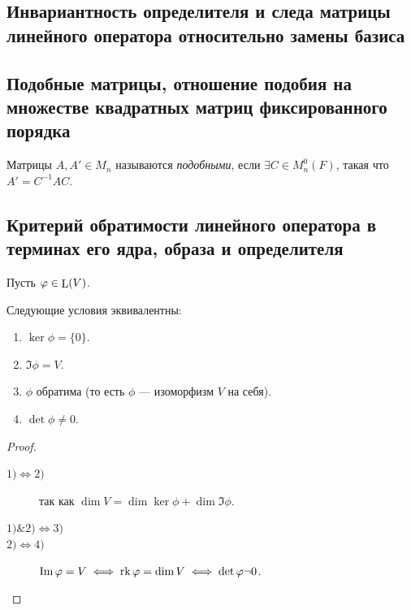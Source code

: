 \subsection{Инвариантность определителя и следа матрицы линейного оператора относительно замены базиса}

\subsection{Подобные матрицы, отношение подобия на множестве квадратных матриц фиксированного порядка}

\begin{definition}
    Матрицы $A, A' \in M_n$ называются \textit{подобными}, если $\exists C \in M_n^{0}(F)$, такая что $A' = C^{-1} A C$.
\end{definition}

\subsection{Критерий обратимости линейного оператора в терминах его ядра, образа и определителя}

Пусть $\varphi \in \operatorname{\mathop{\mathrm{L}}}(V)$.

\begin{proposal}
    Следующие условия эквивалентны:
    \begin{enumerate}[nosep]
    \item $\ker \phi = \{0\}$.
    \item $\Im \phi = V$.
    \item $\phi$ обратима (то есть $\phi$ --- изоморфизм $V$ на себя).
    \item $\det \phi \neq 0$.
    \end{enumerate}
\end{proposal}

\begin{proof}~
    \begin{description}
        \item[$1) \iff 2)$] так как $\dim V = \dim \ker \phi + \dim \Im \phi$. 
        \item[$1) \& 2) \iff 3)$]
        \item[$2) \iff 4)$] $\operatorname{\mathop{\mathrm{Im}}} \varphi = V \iff \operatorname{\mathop{\mathrm{rk}}} \varphi = \dim V \iff \det \varphi \neg 0$.
    \end{description}
\end{proof}

